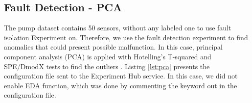 \documentclass[preprint,12pt, a4paper]{elsarticle}
\begin{document}









\clearpage
\subsection{Fault Detection - PCA} \label{res:fd}


The pump dataset contains 50 sensors, without any labeled one to use fault isolation Experiment on. Therefore, we use the fault detection experiment to find anomalies that could present possible malfunction. In this case, principal component analysis (PCA) is applied with Hotelling's T-squared and SPE/DmodX tests to find the outliers \citep{Taskesen_pca_A_Python_2020}. Listing \ref{lst:pca} presents the configuration file sent to the Experiment Hub service. In this case, we did not enable EDA function, which was done by commenting the keyword out in the configuration file. %
\end{document}
